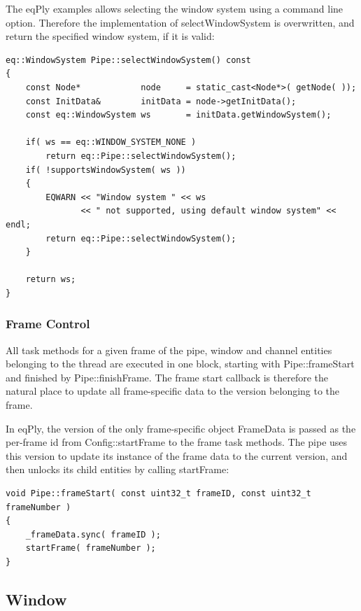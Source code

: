 \documentclass[10pt,a4]{scrartcl}
\begin{document}
The \textsf{eqPly} examples allows selecting the window system using a
command line option. Therefore the implementation of
\textsf{selectWindowSystem} is overwritten, and return the specified
window system, if it is valid:

{\footnotesize\begin{lstlisting}
eq::WindowSystem Pipe::selectWindowSystem() const
{
    const Node*            node     = static_cast<Node*>( getNode( ));
    const InitData&        initData = node->getInitData();
    const eq::WindowSystem ws       = initData.getWindowSystem();

    if( ws == eq::WINDOW_SYSTEM_NONE )
        return eq::Pipe::selectWindowSystem();
    if( !supportsWindowSystem( ws ))
    {
        EQWARN << "Window system " << ws 
               << " not supported, using default window system" << endl;
        return eq::Pipe::selectWindowSystem();
    }

    return ws;
}
\end{lstlisting}}%

\subsubsection{Frame Control}

All task methods for a given frame of the pipe, window and channel
entities belonging to the thread are executed in one block, starting
with \textsf{Pipe::frameStart} and finished by
\textsf{Pipe::finishFrame}. The frame start callback is therefore the
natural place to update all frame-specific data to the version belonging
to the frame. 

In \textsf{eqPly}, the version of the only frame-specific object
\textsf{FrameData} is passed as the per-frame id from
\textsf{Config::startFrame} to the frame task methods. The pipe uses
this version to update its instance of the frame data to the current
version, and then unlocks its child entities by calling
\textsf{startFrame}:

{\footnotesize\begin{lstlisting}
void Pipe::frameStart( const uint32_t frameID, const uint32_t frameNumber )
{
    _frameData.sync( frameID );
    startFrame( frameNumber );
}
\end{lstlisting}}


\subsection{Window}
\end{document}
